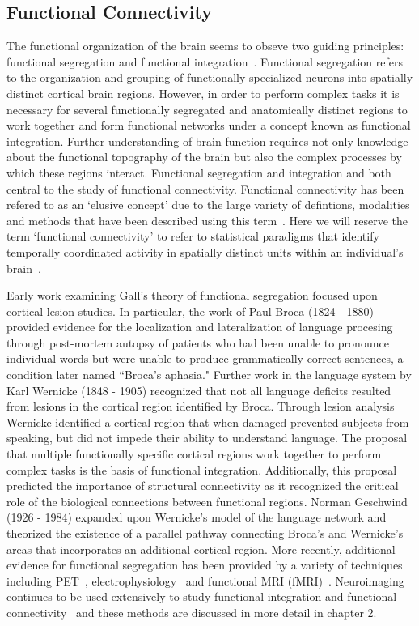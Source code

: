 \subsection{Functional Connectivity}
The functional organization of the brain seems to obseve two guiding principles: functional segregation and functional integration~\cite{Tononi1994}. Functional segregation refers to the organization and grouping of functionally specialized neurons into spatially distinct cortical brain regions. However, in order to perform complex tasks it is necessary for several functionally segregated and anatomically distinct regions to work together and form functional networks under a concept known as functional integration. Further understanding of brain function requires not only knowledge about the functional topography of the brain but also the complex processes by which these regions interact. Functional segregation and integration and both central to the study of functional connectivity. Functional connectivity has been refered to as an `elusive concept' due to the large variety of defintions, modalities and methods that have been described using this term~\cite{Horwitz2003}. Here we will reserve the term `functional connectivity' to refer to statistical paradigms that identify temporally coordinated activity in spatially distinct units within an individual's brain~\cite{Rykhlevskaia2008}.

Early work examining Gall's theory of functional segregation focused upon cortical lesion studies. In particular, the work of Paul Broca (1824 - 1880) provided evidence for the localization and lateralization of language procesing through post-mortem autopsy of patients who had been unable to pronounce individual words but were unable to produce grammatically correct sentences, a condition later named ``Broca's aphasia." Further work in the language system by Karl Wernicke (1848 - 1905) recognized that not all language deficits resulted from lesions in the cortical region identified by Broca. Through lesion analysis Wernicke identified a cortical region that when damaged prevented subjects from speaking, but did not impede their ability to understand language. The proposal that multiple functionally specific cortical regions work together to perform complex tasks is the basis of functional integration. Additionally, this proposal predicted the importance of structural connectivity as it recognized the critical role of the biological connections between functional regions. Norman Geschwind (1926 - 1984) expanded upon Wernicke's model of the language network and theorized the existence of a parallel pathway connecting Broca's and Wernicke's areas that incorporates an additional cortical region. More recently, additional evidence for functional segregation has been provided by a variety of techniques including PET~\cite{Zeki1991}, electrophysiology~\cite{Gevins1999} and functional MRI (fMRI)~\cite{Howard1996}. Neuroimaging continues to be used extensively to study functional integration and functional connectivity~\cite{Sporns2007B} and these methods are discussed in more detail in chapter 2.


